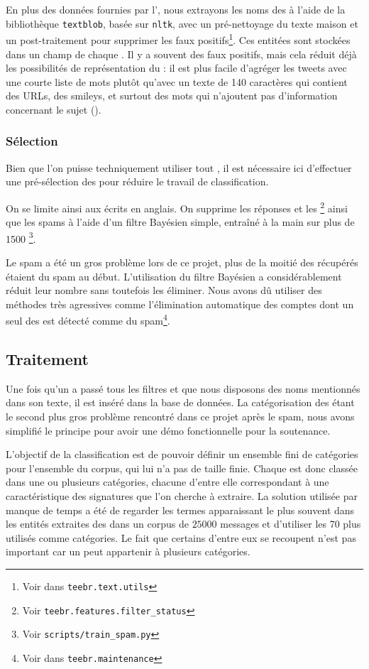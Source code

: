 En plus des données fournies par l’\api{}, nous extrayons les noms des
\tweets{} à l’aide de la bibliothèque \verb|textblob|, basée sur \verb|nltk|,
avec un pré-nettoyage du texte maison et un post-traitement pour supprimer les
faux positifs\footnote{Voir dans \verb|teebr.text.utils|}. Ces entitées sont
stockées dans un champ de chaque \tweet{}. Il y a souvent des faux positifs,
mais cela réduit déjà les possibilités de représentation du \tweet{} : il est
plus facile d’agréger les tweets avec une courte liste de mots plutôt qu’avec
un texte de 140 caractères qui contient des URLs, des smileys, et surtout des
mots qui n’ajoutent pas d’information concernant le sujet ().

\subsubsection{Sélection}

Bien que l’on puisse techniquement utiliser tout \tweet{}, il est nécessaire
ici d’effectuer une pré-sélection des \tweets{} pour réduire le travail de
classification.

On se limite ainsi aux \tweets{} écrits en anglais. On supprime les réponses
et les \rts{}\footnote{Voir \verb|teebr.features.filter_status|} ainsi que les
spams à l’aide d’un filtre Bayésien simple, entraîné à la main sur plus de 1500
\tweets{}\footnote{Voir \verb|scripts/train_spam.py|}.

Le spam a été un gros problème lors de ce projet, plus de la moitié des
\tweets{} récupérés étaient du spam au début. L’utilisation du filtre Bayésien
a considérablement réduit leur nombre sans toutefois les éliminer. Nous avons
dû utiliser des méthodes très agressives comme l’élimination automatique des
comptes dont un seul des \tweets{} est détecté comme du spam\footnote{Voir dans
\verb|teebr.maintenance|}.

\subsection{Traitement}

Une fois qu’un \tweet{} a passé tous les filtres et que nous disposons des noms
mentionnés dans son texte, il est inséré dans la base de données. La
catégorisation des \tweets{} étant le second plus gros problème rencontré dans
ce projet après le spam, nous avons simplifié le principe pour avoir une démo
fonctionnelle pour la soutenance.

L’objectif de la classification est de pouvoir définir un ensemble fini de
catégories pour l’ensemble du corpus, qui lui n’a pas de taille finie. Chaque
\tweet{} est donc classée dans une ou plusieurs catégories, chacune d’entre
elle correspondant à une caractéristique des signatures que l’on cherche à
extraire. La solution utilisée par manque de temps a été de regarder les termes
apparaissant le plus souvent dans les entités extraites des \tweets{} dans un
corpus de $25000$ messages et d’utiliser les 70 plus utilisés comme catégories.
Le fait que certains d’entre eux se recoupent n’est pas important car un
\tweet{} peut appartenir à plusieurs catégories.

